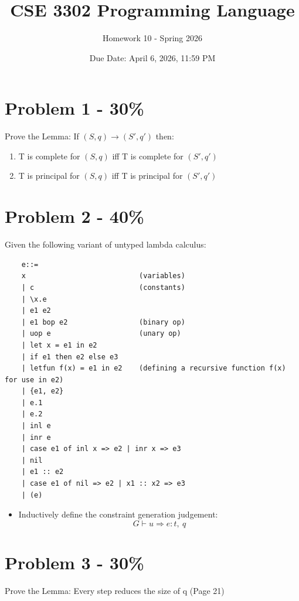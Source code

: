\documentclass{article}
\begin{document}
\title{CSE 3302 Programming Language}
\author{Homework 10 - Spring 2026}
\date{Due Date: April 6, 2026, 11:59 PM}
\maketitle
\thispagestyle{fancy}


\section*{Problem 1 - 30\%}

Prove the Lemma: If $(S,q) \rightarrow (S', q')$ then:
\begin{enumerate}
    \item T is complete for $(S, q)$ iff T is complete for $(S',q')$
    
    \item T is principal for $(S,q)$ iff T is principal for $(S',q')$
\end{enumerate}


\section*{Problem 2 - 40\%}

Given the following variant of untyped lambda calculus:
	\begin{verbatim}
	e::=
	x                           (variables)
	| c                         (constants)
	| \x.e
	| e1 e2
	| e1 bop e2                 (binary op)
	| uop e                     (unary op)
	| let x = e1 in e2
	| if e1 then e2 else e3
	| letfun f(x) = e1 in e2    (defining a recursive function f(x) for use in e2)
	| {e1, e2}
	| e.1
	| e.2
	| inl e
	| inr e
	| case e1 of inl x => e2 | inr x => e3
	| nil
	| e1 :: e2
	| case e1 of nil => e2 | x1 :: x2 => e3
	| (e)
	\end{verbatim}

	\begin{itemize}
    \item Inductively define the constraint generation judgement:
	\[G \vdash u \Rightarrow e : t,\ q\]
    \end{itemize}


\section*{Problem 3 - 30\%}
	Prove the Lemma: Every step reduces the size of q (Page 21)


\vspace{20pt}
\vspace{0.8em}
\end{document}
